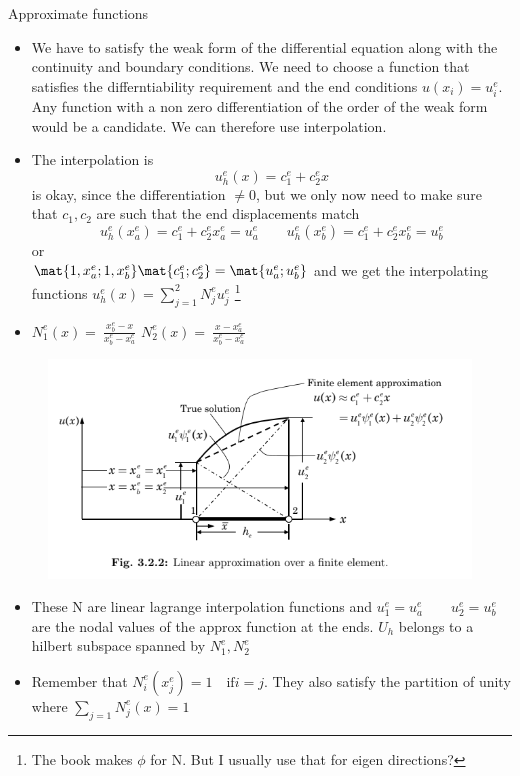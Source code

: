 	\begin{frame}{Approximate functions}
		\begin{itemize}
			\item We have to satisfy the weak form of the differential equation along with the continuity and boundary conditions. We need to choose a function that satisfies the differntiability requirement and the end conditions $u(x_i) = u^e_i$.
			Any function with a non zero differentiation of the order of the weak form would be a candidate. We can therefore use interpolation.
			\item The interpolation is
			\begin{equation}
				u^e_h(x) = c_1^e + c_2^e x
			\end{equation}
			is okay, since the differentiation $\neq 0$, but we only now need to make sure that $c_1, c_2$ are such that the end displacements match
			\begin{equation}
				u^e_h(x_a^e) = c_1^e + c_2^ex_a^e = u_a^e \qquad
				u^e_h(x_b^e) = c_1^e + c_2^ex_b^e = u_b^e
			\end{equation}
			or \\
			$\mat{1,x_a^e;1,x_b^e} \mat{c_1^e;c_2^e} = \mat{u_a^e;u_b^e}$
			and we get the interpolating functions $u_h^e(x) = \sum_{j=1}^{2} N_j^eu_j^e$ \footnote{The book makes $\phi$ for N. But I usually use that for eigen directions?} 
			\item $N_1^e(x) = \ \frac{x_b^e-x}{x_b^e-x_a^e}$ \qquad $N_2^e(x) = \ \frac{x-x_a^e}{x_b^e-x_a^e}$
		\end{itemize}
	\end{frame}

	
	\begin{frame}
		\begin{figure}
			\centering
			\includegraphics[width=0.7\linewidth]{Figure/fig3} 
		\end{figure}
		\begin{itemize}
			\item These N are linear lagrange interpolation functions and $u_1^e = u_a^e \qquad u_2^e = u_b^e$ are the nodal values of the approx function at the ends. $U_h$ belongs to a hilbert subspace spanned by $N_1^e,N_2^e$
			\item Remember that $N_i^e(x^e_j) = 1 \quad \text{if} i=j$. They also satisfy the partition of unity where $\sum_{j=1} N_j^e(x) =1$
			
		\end{itemize}
	\end{frame}


